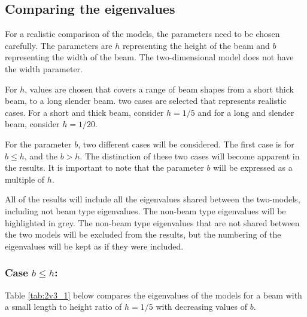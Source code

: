 \subsection{Comparing the eigenvalues}
For a realistic comparison of the models, the parameters need to be chosen carefully. The parameters are $h$ representing the height of the beam and $b$ representing the width of the beam. The two-dimensional model does not have the width parameter.

For $h$, values are chosen that covers a range of beam shapes from a short thick beam, to a long slender beam. two cases are selected that represents realistic cases. For a short and thick beam, consider $h = 1/5$ and for a long and slender beam, consider $h = 1/20$.

For the parameter $b$, two different cases will be considered. The first case is for $b \leq h$, and the $b > h$. The distinction of these two cases will become apparent in the results. It is important to note that the parameter $b$ will be expressed as a multiple of $h$.

All of the results will include all the eigenvalues shared between the two-models, including not beam type eigenvalues. The non-beam type eigenvalues will be highlighted in grey. The non-beam type eigenvalues that are not shared between the two models will be excluded from the results, but the numbering of the eigenvalues will be kept as if they were included.

\subsubsection*{Case $b \leq h$:}
Table \ref{tab:2v3_1} below compares the eigenvalues of the models for a beam with a small length to height ratio of $h=1/5$ with decreasing values of $b$. 

